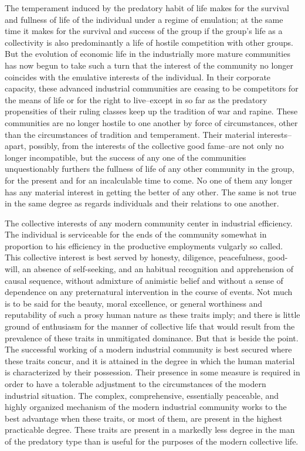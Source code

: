 \documentclass[12pt]{report}
\begin{document}
The temperament induced by the predatory habit of life makes for the
survival and fullness of life of the individual under a regime of
emulation; at the same time it makes for the survival and success of the
group if the group's life as a collectivity is also predominantly a life
of hostile competition with other groups. But the evolution of economic
life in the industrially more mature communities has now begun to take
such a turn that the interest of the community no longer coincides with
the emulative interests of the individual. In their corporate capacity,
these advanced industrial communities are ceasing to be competitors
for the means of life or for the right to live--except in so far as the
predatory propensities of their ruling classes keep up the tradition of
war and rapine. These communities are no longer hostile to one another
by force of circumstances, other than the circumstances of tradition
and temperament. Their material interests--apart, possibly, from
the interests of the collective good fame--are not only no longer
incompatible, but the success of any one of the communities
unquestionably furthers the fullness of life of any other community in
the group, for the present and for an incalculable time to come. No one
of them any longer has any material interest in getting the better
of any other. The same is not true in the same degree as regards
individuals and their relations to one another.

The collective interests of any modern community center in industrial
efficiency. The individual is serviceable for the ends of the community
somewhat in proportion to his efficiency in the productive employments
vulgarly so called. This collective interest is best served by honesty,
diligence, peacefulness, good-will, an absence of self-seeking, and
an habitual recognition and apprehension of causal sequence, without
admixture of animistic belief and without a sense of dependence on any
preternatural intervention in the course of events. Not much is to
be said for the beauty, moral excellence, or general worthiness and
reputability of such a prosy human nature as these traits imply; and
there is little ground of enthusiasm for the manner of collective life
that would result from the prevalence of these traits in unmitigated
dominance. But that is beside the point. The successful working of a
modern industrial community is best secured where these traits concur,
and it is attained in the degree in which the human material is
characterized by their possession. Their presence in some measure is
required in order to have a tolerable adjustment to the circumstances of
the modern industrial situation. The complex, comprehensive, essentially
peaceable, and highly organized mechanism of the modern industrial
community works to the best advantage when these traits, or most of
them, are present in the highest practicable degree. These traits are
present in a markedly less degree in the man of the predatory type than
is useful for the purposes of the modern collective life.
\end{document}
